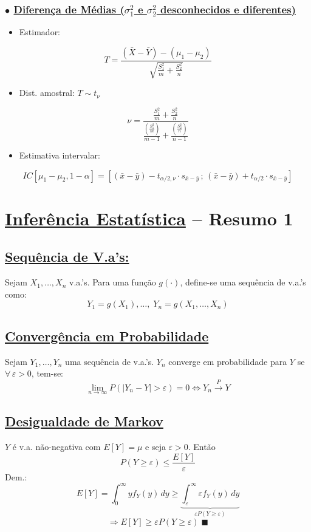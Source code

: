 \documentclass[11pt,a4paper]{article}
\begin{document}
\subsubsection*{$\bullet$ \underline{Diferença de Médias ($\sigma_1^2$ e $\sigma_2^2$ desconhecidos e diferentes)}}
\begin{itemize}
  \item Estimador:
\end{itemize}
\[ T = \frac{(\bar{X}-\bar{Y})-(\mu_1-\mu_2)}{\sqrt{\frac{S_1^2}{m}+\frac{S_2^2}{n}}} \]
\begin{itemize}
  \item Dist. amostral: $T \sim t_\nu$
\end{itemize}
\[ \nu = \frac{\frac{S_1^2}{m}+\frac{S_2^2}{n}}{\frac{\left(\frac{S_1^2}{m}\right)}{m-1}+\frac{\left(\frac{S_2^2}{n}\right)}{n-1}} \]
\begin{itemize}
  \item Estimativa intervalar:
\end{itemize}
\[ IC[\mu_1-\mu_2,1-\alpha] = \left[(\bar{x}-\bar{y}) - t_{\alpha/2,\nu}\cdot s_{\bar{x}-\bar{y}}\,;\,(\bar{x}-\bar{y}) + t_{\alpha/2}\cdot s_{\bar{x}-\bar{y}}\right] \]

\section*{\underline{Inferência Estatística} -- Resumo 1}

\subsection*{\underline{Sequência de V.a's:}}
Sejam $X_1,\ldots,X_n$ v.a.'s. Para uma função $g(\cdot)$, define-se uma sequência de v.a.'s como:
\[ Y_1 = g(X_1),\ldots,\; Y_n = g(X_1,\ldots,X_n) \]

\subsection*{\underline{Convergência em Probabilidade}}
Sejam $Y_1,\ldots,Y_n$ uma sequência de v.a.'s. $Y_n$ converge em probabilidade para $Y$ se $\forall\,\varepsilon>0$, tem-se:
\[ \lim_{n\to\infty} P(|Y_n-Y|>\varepsilon) = 0 \iff Y_n \xrightarrow{\;P\;} Y \]

\subsection*{\underline{Desigualdade de Markov}}
$Y$ é v.a. não-negativa com $E[Y]=\mu$ e seja $\varepsilon>0$. Então
\[ P(Y\geq\varepsilon) \leq \frac{E[Y]}{\varepsilon} \]
Dem.:
\[ E[Y] = \int_0^\infty y f_Y(y)\,dy \geq \underbrace{\int_\varepsilon^\infty \varepsilon f_Y(y)\,dy}_{\varepsilon P(Y\geq\varepsilon)} \]
\[ \Rightarrow E[Y] \geq \varepsilon P(Y\geq\varepsilon) \;\blacksquare \]
\end{document}
